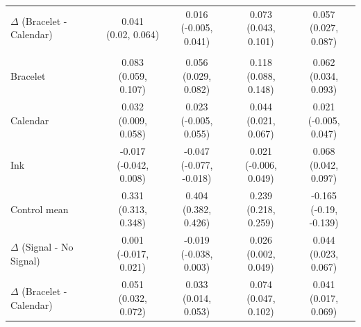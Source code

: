{\begin{tabular}[t]{lcccc}
\addlinespace 
\hspace{1em}$\Delta$ (Bracelet - Calendar) & \makecell[c]{0.041\\(0.02, 0.064)} & \makecell[c]{0.016\\(-0.005, 0.041)} & \makecell[c]{0.073\\(0.043, 0.101)} & \makecell[c]{0.057\\(0.027, 0.087)}\\
\addlinespace 
\addlinespace[0.3em]
\hline
\multicolumn{5}{l}{\textit{\textbf{Panel C: First-Order Observability, Missing Data Marginalized}}}\\
\hline
\hspace{1em}Bracelet & \makecell[c]{0.083\\(0.059, 0.107)} & \makecell[c]{0.056\\(0.029, 0.082)} & \makecell[c]{0.118\\(0.088, 0.148)} & \makecell[c]{0.062\\(0.034, 0.093)}\\
\addlinespace 
\hspace{1em}Calendar & \makecell[c]{0.032\\(0.009, 0.058)} & \makecell[c]{0.023\\(-0.005, 0.055)} & \makecell[c]{0.044\\(0.021, 0.067)} & \makecell[c]{0.021\\(-0.005, 0.047)}\\
\addlinespace 
\hspace{1em}Ink & \makecell[c]{-0.017\\(-0.042, 0.008)} & \makecell[c]{-0.047\\(-0.077, -0.018)} & \makecell[c]{0.021\\(-0.006, 0.049)} & \makecell[c]{0.068\\(0.042, 0.097)}\\
\midrule
\addlinespace 
\hspace{1em}Control mean & \makecell[c]{0.331\\(0.313, 0.348)} & \makecell[c]{0.404\\(0.382, 0.426)} & \makecell[c]{0.239\\(0.218, 0.259)} & \makecell[c]{-0.165\\(-0.19, -0.139)}\\
\addlinespace 
\hspace{1em}$\Delta$ (Signal - No Signal) & \makecell[c]{0.001\\(-0.017, 0.021)} & \makecell[c]{-0.019\\(-0.038, 0.003)} & \makecell[c]{0.026\\(0.002, 0.049)} & \makecell[c]{0.044\\(0.023, 0.067)}\\
\addlinespace 
\hspace{1em}$\Delta$ (Bracelet - Calendar) & \makecell[c]{0.051\\(0.032, 0.072)} & \makecell[c]{0.033\\(0.014, 0.053)} & \makecell[c]{0.074\\(0.047, 0.102)} & \makecell[c]{0.041\\(0.017, 0.069)}\\
\bottomrule
\end{tabular}}
